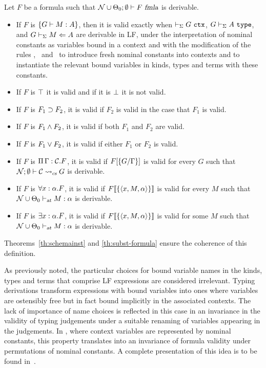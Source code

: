 \begin{definition}\label{def:semantics}
Let $F$ be a formula such that $\wfform{\noms \cup
  \STLCGamma_0}{\emptyset}{F}$ is derivable. 
%
\begin{itemize}
\item If $F$ is $\fatm{G}{M:A}$, then it is valid exactly when $\lfctx{G}$,
  $\lftype{G}{A}$, and $\lfchecktype{G}{M}{A}$ are derivable in LF,
  under the interpretation of nominal constants as variables bound in
  a context and with the modification of the rules \canonkindpi, \canonfampi\ and
  \canontermlam\ to introduce fresh nominal constants into contexts and to
  instantiate the relevant bound variables in kinds, types and terms with
  these constants.

\item If $F$ is $\ftrue$ it is valid and if it is $\ffalse$ it is not valid.

\item If $F$ is $\fimp{F_1}{F_2}$, it is valid if $F_2$ is valid in
  the case that $F_1$ is valid.

\item If $F$ is $\fand{F_1}{F_2}$, it is valid if both $F_1$ and
  $F_2$ are valid.

\item If $F$ is $\myfor{F_1}{F_2}$, it is valid if either $F_1$ or $F_2$ is valid.

\item If $F$ is $\fctx{\Gamma}{\mathcal{C}}{F}$, it is valid if
  $\subst{\{G/\Gamma\}}{F}$ is valid for every $G$ such that
  $\csinst{\noms}{\emptyset}{\mathcal{C}}{G}$ is derivable.

\item If $F$ is $\fall{x:\alpha}{F}$, it is valid if
  $\hsubst{\{\langle x, M,\alpha\rangle \}}{F}$ is valid for every $M$ such that
  $\stlctyjudg{\noms \cup \STLCGamma_0}{M}{\alpha}$ is derivable.

\item If $F$ is $\fexists{x:\alpha}{F}$, it is valid if
  $\hsubst{\{\langle x, M,\alpha\rangle \}}{F}$ is valid for some $M$ such that 
  $\stlctyjudg{\noms \cup \STLCGamma_0}{M}{\alpha}$ is derivable.
\end{itemize}
\end{definition}

Theorems~\ref{th:schemainst} and \ref{th:subst-formula} ensure the
coherence of this definition. 

As previously noted, the particular choices for bound variable names
in the kinds, types and terms that comprise LF expressions are
considered irrelevant. 
%
Typing derivations transform expressions with bound variables into
ones where variables are ostensibly free but in fact bound implicitly
in the associated contexts.
%
The lack of importance of name choices is reflected in this case in an
invariance in the validity of typing judgements under a suitable
renaming of variables appearing in the judgements.
%
In \logic, where context variables are represented by nominal
constants, this property translates into an invariance of formula
validity under permutations of nominal constants. 
%
A complete presentation of this idea is to be found
in~\cite{nadathur21arxiv}. 

